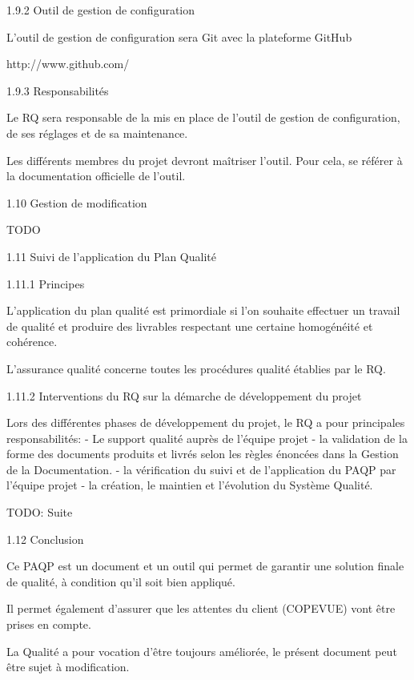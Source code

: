 1.9.2   Outil de gestion de configuration

L'outil de gestion de configuration sera Git avec la plateforme GitHub

http://www.github.com/

1.9.3   Responsabilités

Le RQ sera responsable de la mis en place de l'outil de gestion de configuration, de ses réglages et de sa maintenance.

Les différents membres du projet devront maîtriser l'outil. Pour cela, se référer à la documentation officielle de l'outil.

1.10   Gestion de modification

TODO

1.11   Suivi de l'application du Plan Qualité

1.11.1   Principes

L'application du plan qualité est primordiale si l'on souhaite effectuer un travail de qualité et produire des livrables respectant une certaine homogénéité et cohérence.

L'assurance qualité concerne toutes les procédures qualité établies par le RQ.

1.11.2   Interventions du RQ sur la démarche de développement du projet

Lors des différentes phases de développement du projet, le RQ a pour principales responsabilités: - Le support qualité auprès de l'équipe projet - la validation de la forme des documents produits et livrés selon les règles énoncées dans la Gestion de la Documentation. - la vérification du suivi et de l'application du PAQP par l'équipe projet - la création, le maintien et l'évolution du Système Qualité.

TODO: Suite

1.12   Conclusion

Ce PAQP est un document et un outil qui permet de garantir une solution finale de qualité, à condition qu'il soit bien appliqué.

Il permet également d'assurer que les attentes du client (COPEVUE) vont être prises en compte.

La Qualité a pour vocation d'être toujours améliorée, le présent document peut être sujet à modification.